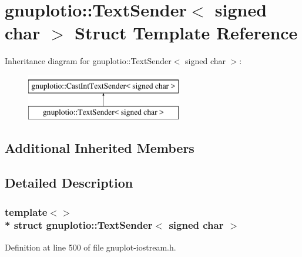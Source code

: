 \hypertarget{structgnuplotio_1_1_text_sender_3_01signed_01char_01_4}{}\section{gnuplotio\+:\+:Text\+Sender$<$ signed char $>$ Struct Template Reference}
\label{structgnuplotio_1_1_text_sender_3_01signed_01char_01_4}
Inheritance diagram for gnuplotio\+:\+:Text\+Sender$<$ signed char $>$\+:\begin{figure}[H]
\begin{center}
\leavevmode
\includegraphics[height=2.000000cm]{structgnuplotio_1_1_text_sender_3_01signed_01char_01_4}
\end{center}
\end{figure}
\subsection*{Additional Inherited Members}


\subsection{Detailed Description}
\subsubsection*{template$<$$>$\\*
struct gnuplotio\+::\+Text\+Sender$<$ signed char $>$}



Definition at line 500 of file gnuplot-\/iostream.\+h.

